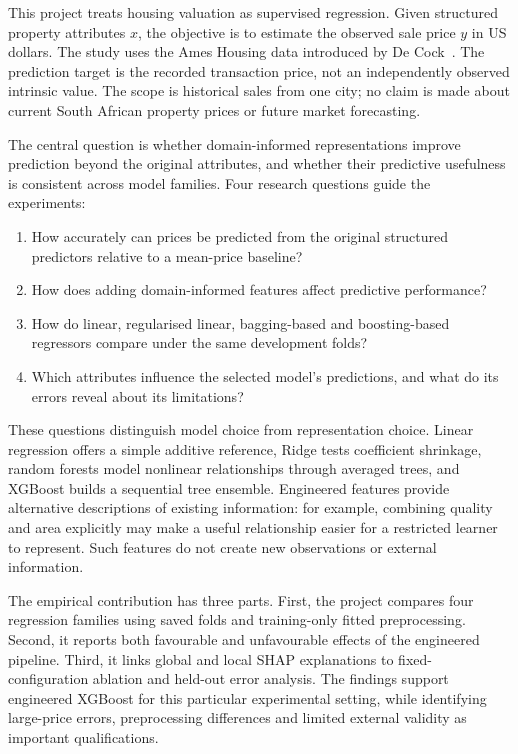 \documentclass{sigkddExp}
\begin{document}
This project treats housing valuation as supervised regression. Given structured property attributes $x$, the objective is to estimate the observed sale price $y$ in US dollars. The study uses the Ames Housing data introduced by De Cock~\cite{decock}. The prediction target is the recorded transaction price, not an independently observed intrinsic value. The scope is historical sales from one city; no claim is made about current South African property prices or future market forecasting.

The central question is whether domain-informed representations improve prediction beyond the original attributes, and whether their predictive usefulness is consistent across model families. Four research questions guide the experiments:
\begin{enumerate}
\item How accurately can prices be predicted from the original structured predictors relative to a mean-price baseline?
\item How does adding domain-informed features affect predictive performance?
\item How do linear, regularised linear, bagging-based and boosting-based regressors compare under the same development folds?
\item Which attributes influence the selected model's predictions, and what do its errors reveal about its limitations?
\end{enumerate}

These questions distinguish model choice from representation choice. Linear regression offers a simple additive reference, Ridge tests coefficient shrinkage, random forests model nonlinear relationships through averaged trees, and XGBoost builds a sequential tree ensemble. Engineered features provide alternative descriptions of existing information: for example, combining quality and area explicitly may make a useful relationship easier for a restricted learner to represent. Such features do not create new observations or external information.

The empirical contribution has three parts. First, the project compares four regression families using saved folds and training-only fitted preprocessing. Second, it reports both favourable and unfavourable effects of the engineered pipeline. Third, it links global and local SHAP explanations to fixed-configuration ablation and held-out error analysis. The findings support engineered XGBoost for this particular experimental setting, while identifying large-price errors, preprocessing differences and limited external validity as important qualifications.
\end{document}

